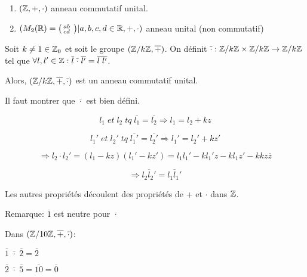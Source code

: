 \begin{exmp} $\;$
	\begin{enumerate}
	\item $(\mathbb{Z},+,\cdot)$ anneau commutatif unital.
	\item $(M_2 (\mathbb{R}) = { \bigl( \begin{smallmatrix} a b&\\c d& \end{smallmatrix}\bigr)  | a,b,c,d \in \mathbb{R} },+,\cdot )$ anneau unital (non commutatif) 
	\end{enumerate}
\end{exmp}

\begin{prop}
Soit $k \neq 1 \in \mathbb{Z}_0$ et soit le groupe $(\mathbb{Z}/k\mathbb{Z},\overline{+})$. On définit $\overline{\cdot}: \mathbb{Z}/k\mathbb{Z} \times \mathbb{Z}/k\mathbb{Z} \rightarrow \mathbb{Z}/k\mathbb{Z}$ tel que $\forall l,{l}' \in \mathbb{Z}: \overline{l}\; \overline{\cdot}\; \overline{{l}'} = \overline{l\;{l}'}$.

\hspace{-0.55cm}Alors, $(\mathbb{Z}/k\mathbb{Z},\overline{+},\overline{\cdot})$ est un anneau commutatif unital.
\end{prop}

\begin{demo}
Il faut montrer que $\overline{\cdot}$ est bien défini.

\[ l_1 \;et\; l_2 \;tq\; \overline{l_1} = \overline{l_2} \Rightarrow l_1 = l_2 + kz  \]

\[ {l_1}' \;et\; {l_2}' \;tq\; \overline{{l_1}'} = \overline{{l_2}'} \Rightarrow {l_1}' = {l_2}' + k{z}' \]

\[\Rightarrow l_2 \cdot {l_2}' = (l_1 - kz)({l_1}' - k{z}') = l_1 {l_1}' - k{l_1}'z - kl_1{z}' - kkz\overline{z} \]

\[ \Rightarrow \overline{l_2 {l_2}'} = \overline{l_1 {l_1}'} \]

Les autres propriétés découlent des propriétés de + et $\cdot$ dans $\mathbb{Z}$.

Remarque: $\overline{1}$ est neutre pour $\overline{\cdot}$
\end{demo}

\begin{exmp}
Dans $(\mathbb{Z}/10\mathbb{Z}, \overline{+}, \overline{\cdot})$: 

\hspace{-0.55cm}$\overline{1}\; \overline{\cdot}\; \overline{2} = \overline{2}$

\hspace{-0.55cm}$\overline{2}\; \overline{\cdot}\; \overline{5} = \overline{10} = \overline{0}$
\end{exmp}

